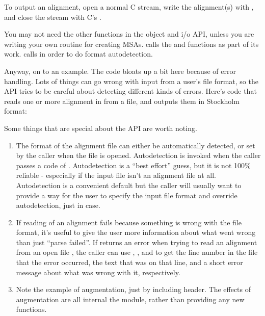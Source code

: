 To output an alignment, open a normal C  stream, write the
alignment(s) with , and close the stream with
C's .

You may not need the other functions in the object and i/o API, unless
you are writing your own routine for creating
MSAs.  calls the 
and  functions as part of its
work.  calls
 in order to do format
autodetection.

Anyway, on to an example. The code bloats up a bit here because of
error handling. Lots of things can go wrong with input from a user's
file format, so the API tries to be careful about detecting different
kinds of errors. Here's code that reads one or more alignment in from
a file, and outputs them in Stockholm format:



Some things that are special about the API are worth noting.

\begin{enumerate}
\item The format of the alignment file can either be automatically
      detected, or set by the caller when the file is opened.
      Autodetection is invoked when the caller passes a 
      code of . Autodetection is a ``best
      effort'' guess, but it is not 100\% reliable - especially if the
      input file isn't an alignment file at all. Autodetection is a
      convenient default but the caller will usually want to provide a
      way for the user to specify the input file format and override
      autodetection, just in case.

\item If reading of an alignment fails because something is wrong with
      the file format, it's useful to give the user more information
      about what went wrong than just ``parse failed''. If
       returns an  error
      when trying to read an alignment from an open file ,
      the caller can use , ,
      and  to get the line number in the file that
      the error occurred, the text that was on that line, and a short
      error message about what was wrong with it, respectively.

\item Note the example of  augmentation, just by
      including  header. The effects of
       augmentation are all internal the 
      module, rather than providing any new functions.
\end{enumerate}

